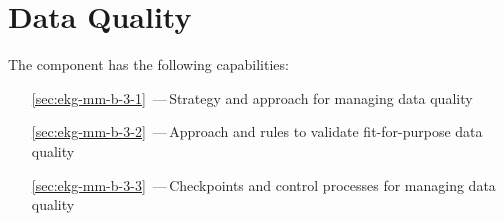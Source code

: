 \chapter{Data Quality}\label{ch:ekg-mm-b-3} %

The  component has the following capabilities:

\begin{itemize}[leftmargin=.5in]
  \item [\ref{sec:ekg-mm-b-3-1}] \,---\,Strategy and approach for managing data quality
  \item [\ref{sec:ekg-mm-b-3-2}] \,---\,Approach and rules to validate fit-for-purpose data quality
  \item [\ref{sec:ekg-mm-b-3-3}] \,---\,Checkpoints and control processes for managing data quality
\end{itemize}




